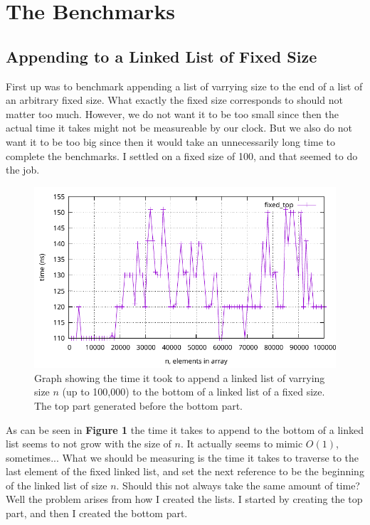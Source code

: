 \documentclass[a4paper, 11pt]{article}
\begin{document}
\section{The Benchmarks}
	\subsection{Appending to a Linked List of Fixed Size}
	First up was to benchmark appending a list of varrying size to the end of a list of an arbitrary fixed size.
	What exactly the fixed size corresponds to should not matter too much.
	However, we do not want it to be too small since then the actual time it takes might not be measureable by our clock.
	But we also do not want it to be too big since then it would take an unnecessarily long time to complete the benchmarks.
	I settled on a fixed size of 100, and that seemed to do the job.
	\begin{figure}[H]
		\centering
		\includegraphics[scale=0.8]{graphs/fixed_top_gen_top_first.pdf}
		\caption{
			Graph showing the time it took to append a linked list of varrying size \(n\) (up to 100,000) to the bottom of a linked list of a fixed size.
			The top part generated before the bottom part.
		}
	\end{figure}
	As can be seen in \textbf{Figure 1} the time it takes to append to the bottom of a linked list seems to not grow with the size of \(n\).
	It actually seems to mimic \(O(1)\), sometimes...
	What we should be measuring is the time it takes to traverse to the last element of the fixed linked list,
	and set the next reference to be the beginning of the linked list of size \(n\).
	Should this not always take the same amount of time?
	Well the problem arises from how I created the lists.
	I started by creating the top part, and then I created the bottom part.
\end{document}
